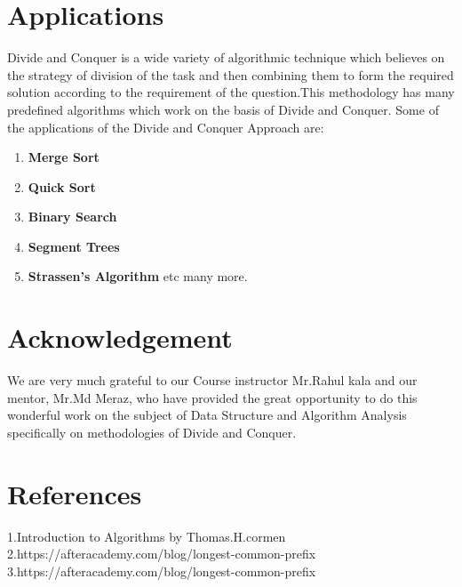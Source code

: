 \documentclass{article}
\begin{document}
\begin{multicols}{2}
\section{Applications}
Divide and Conquer is a wide variety of algorithmic technique which believes on the strategy of division of the task and then combining them to form the required solution according to the requirement of the question.This methodology has many predefined algorithms which work on the basis of Divide and Conquer. Some of the applications of the Divide and Conquer Approach are:

\begin{enumerate}
\item \textbf{Merge Sort}
\item \textbf{Quick Sort}
\item \textbf{Binary Search} 
\item \textbf{Segment Trees} 
\item  \textbf{Strassen’s Algorithm} etc many more.
\end{enumerate}

\section{Acknowledgement}
We are very much grateful to our Course instructor Mr.Rahul kala and our mentor, Mr.Md Meraz, who have provided the great opportunity to do this wonderful work on the subject of Data Structure and Algorithm Analysis specifically on methodologies of Divide and Conquer.

\section{References}
\begin{enumerate}
1.Introduction to Algorithms by Thomas.H.cormen\newline
2.https://afteracademy.com/blog/longest-common-prefix\newline
3.https://afteracademy.com/blog/longest-common-prefix \newline
\end{enumerate}

\end{multicols}
\end{document}
